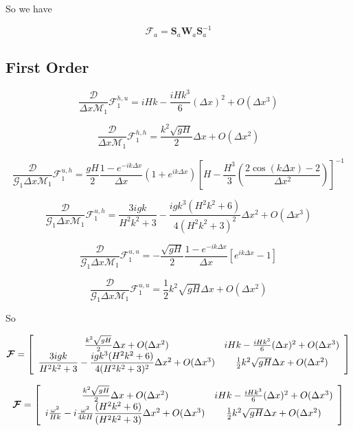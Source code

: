 \documentclass[12pt]{article}
\begin{document}
So we have 

\[\boldsymbol{\mathcal{F}}_a = \boldsymbol{S}_a \boldsymbol{W}_a \boldsymbol{S}^{-1}_a \]



\subsection{First Order}
\[\frac{\mathcal{D}}{\Delta x\mathcal{M}_1}\mathcal{F}^{h,u}_1 = iHk  - \frac{iHk^3}{6}( \Delta x)^2 +  O( \Delta x^3)\]

\[\frac{\mathcal{D}}{\Delta x\mathcal{M}_1}\mathcal{F}^{h,h}_1 = \frac{k^2\sqrt{gH} }{ 2}  \Delta x  + O( \Delta x^2) \]

\[\frac{\mathcal{D}}{\mathcal{G}_1\Delta x\mathcal{M}_1}\mathcal{F}^{u,h}_1 = \dfrac{ gH}{ 2}\frac{1 -e^{-ik\Delta x}}{\Delta x} \left(1 + e^{ik\Delta x}\right) \left[H - \frac{H^3}{3}\left(\frac{ 2\cos\left(k\Delta x\right) - 2 }{\Delta x^2}\right) \right]^{-1}\]

\[\frac{\mathcal{D}}{\mathcal{G}_1\Delta x\mathcal{M}_1}\mathcal{F}^{u,h}_1 = \dfrac{3igk}{H^2k^2 + 3} -\dfrac{igk^3(H^2k^2 + 6)}{4(H^2k^2 + 3)^2}\Delta x ^2 + O(\Delta x ^3) \]



\[\frac{\mathcal{D}}{\mathcal{G}_1\Delta x\mathcal{M}_1}\mathcal{F}^{u,u}_1 = - \dfrac{ \sqrt{gH}}{ 2}\frac{1 -e^{-ik\Delta x}}{\Delta x} \left [ e^{ik\Delta x}  -  1  \right ]\]

\[\frac{\mathcal{D}}{\mathcal{G}_1\Delta x\mathcal{M}_1}\mathcal{F}^{u,u}_1 = \frac{1}{2}k^2\sqrt{gH} \Delta x + O(\Delta x^2)\]


So 

\[\boldsymbol{\mathcal{F}} = \left[\begin{array}{c c}
\frac{k^2\sqrt{gH} }{ 2}  \Delta x  + O( \Delta x^2) & iHk  - \frac{iHk^3}{6}( \Delta x)^2 +  O( \Delta x^3) \\ \dfrac{3igk}{H^2k^2 + 3} -\dfrac{igk^3(H^2k^2 + 6)}{4(H^2k^2 + 3)^2}\Delta x ^2 + O(\Delta x ^3) &  \frac{1}{2}k^2\sqrt{gH} \Delta x + O(\Delta x^2)
\end{array}\right]   \]

\[\boldsymbol{\mathcal{F}} = \left[\begin{array}{c c}
\frac{k^2\sqrt{gH} }{ 2}  \Delta x  + O( \Delta x^2) & iHk  - \frac{iHk^3}{6}( \Delta x)^2 +  O( \Delta x^3) \\i \frac{\omega^2}{Hk} -i \frac{\omega^2}{4kH}\dfrac{(H^2k^2 + 6)}{(H^2k^2 + 3)}\Delta x ^2 + O(\Delta x ^3) &  \frac{1}{2}k^2\sqrt{gH} \Delta x + O(\Delta x^2)
\end{array}\right]   \]
\end{document}
